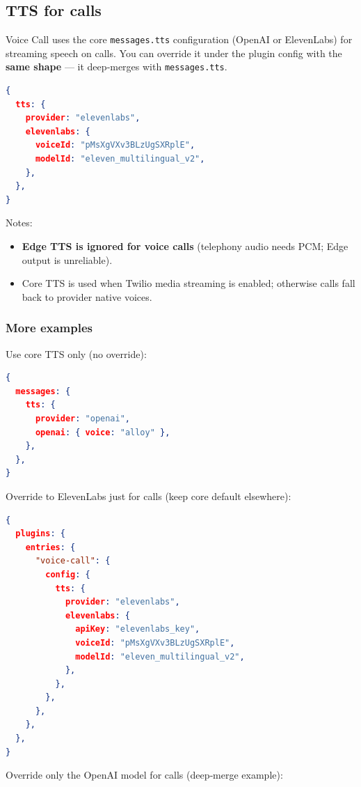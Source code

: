 \subsection{TTS for calls}


Voice Call uses the core \texttt{messages.tts} configuration (OpenAI or ElevenLabs) for
streaming speech on calls. You can override it under the plugin config with the
\textbf{same shape} — it deep‑merges with \texttt{messages.tts}.

\begin{lstlisting}[language=json]
{
  tts: {
    provider: "elevenlabs",
    elevenlabs: {
      voiceId: "pMsXgVXv3BLzUgSXRplE",
      modelId: "eleven_multilingual_v2",
    },
  },
}
\end{lstlisting}


Notes:

\begin{itemize}
  \item \textbf{Edge TTS is ignored for voice calls} (telephony audio needs PCM; Edge output is unreliable).
  \item Core TTS is used when Twilio media streaming is enabled; otherwise calls fall back to provider native voices.
\end{itemize}


\subsubsection{More examples}


Use core TTS only (no override):

\begin{lstlisting}[language=json]
{
  messages: {
    tts: {
      provider: "openai",
      openai: { voice: "alloy" },
    },
  },
}
\end{lstlisting}


Override to ElevenLabs just for calls (keep core default elsewhere):

\begin{lstlisting}[language=json]
{
  plugins: {
    entries: {
      "voice-call": {
        config: {
          tts: {
            provider: "elevenlabs",
            elevenlabs: {
              apiKey: "elevenlabs_key",
              voiceId: "pMsXgVXv3BLzUgSXRplE",
              modelId: "eleven_multilingual_v2",
            },
          },
        },
      },
    },
  },
}
\end{lstlisting}


Override only the OpenAI model for calls (deep‑merge example):

